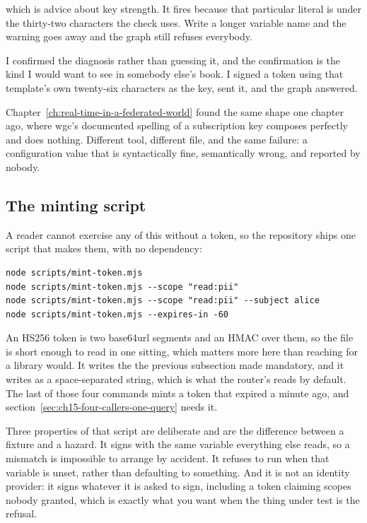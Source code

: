 which is advice about key strength. It fires because that particular literal is
under the thirty-two characters the check uses. Write a longer variable name
and the warning goes away and the graph still refuses everybody.

I confirmed the diagnosis rather than guessing it, and the confirmation is the
kind I would want to see in somebody else's book. I signed a token using that
template's own twenty-six characters as the key, sent it, and the graph
answered.

Chapter~\ref{ch:real-time-in-a-federated-world} found the same shape one
chapter ago, where wgc's documented spelling of a subscription key composes
perfectly and does nothing. Different tool, different file, and the same
failure: a configuration value that is syntactically fine, semantically wrong,
and reported by nobody.

\subsection*{The minting script}

%
A reader cannot exercise any of this without a token, so the repository ships
one script that makes them, with no dependency:

\begin{verbatim}
node scripts/mint-token.mjs
node scripts/mint-token.mjs --scope "read:pii"
node scripts/mint-token.mjs --scope "read:pii" --subject alice
node scripts/mint-token.mjs --expires-in -60
\end{verbatim}

An HS256 token is two base64url segments and an HMAC over them, so the file is
short enough to read in one sitting, which matters more here than reaching for
a library would. It writes the  the previous subsection made
mandatory, and it writes  as a space-separated string, which is
what the router's  reads by default.
The last of those four commands mints a token that expired a minute ago, and
section~\ref{sec:ch15-four-callers-one-query} needs it.

Three properties of that script are deliberate and are the difference between a
fixture and a hazard. It signs with the same variable everything else reads, so
a mismatch is impossible to arrange by accident. It refuses to run when that
variable is unset, rather than defaulting to something. And it is not an
identity provider: it signs whatever it is asked to sign, including a token
claiming scopes nobody granted, which is exactly what you want when the thing
under test is the refusal.

